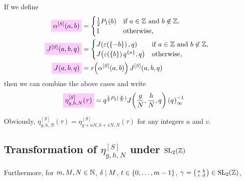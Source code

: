 \documentclass{article}
\begin{document}
If we define
\begin{align}
  \defineNotation[alpha-Schoeneberg-Contribution]{\alphaSchoenebergContribution{a}{b}}
  &=
    \begin{cases}
      \frac{1}{2} P_1(b) & \text{if $a\in\setZ$ and $b\not\in\setZ$},
      \\
      1 & \text{otherwise,}
    \end{cases}
  \label{eq:alpha-Schoeneberg-Contribution}
  \\
  \defineNotation[Jacobi-Schoeneberg]{J^{[S]}(a,b,q)}
  &=
    \begin{cases}
      \jacobiFunction{\unityPower{\left\{-b\right\}}}{q} & \text{if $a\in\setZ$ and
        $b\not\in\setZ$},
      \\
      \jacobiFunction{\unityPower{\left\{b\right\}}q^{\{a\}}}{q} & \text{otherwise,}
    \end{cases}
  \label{eq:Jacobi-Schoeneberg}
  \\
  \defineNotation[Jacobi-a-b-q]{\jacobiAlpha{a}{b}{q}}
  &=
    \unityPower{\alphaSchoenebergContribution{a}{b}} \jacobiSchoeneberg{a}{b}{q}
  \label{eq:Jacobi_a-b-q}
\end{align}
then we can combine the above cases and write
\begin{align}
  \defineNotation[eta-g-h-N-tau-Schoeneberg]{\eta_{g,h,N}^{[S]}(\tau)}
  &=
  q^{\frac{1}{2} P_2(\frac{g}{N})}
    \jacobiAlpha{\frac{g}{N}}{\frac{h}{N}}{q}
    \eulerFunction{}^{-1}
  \label{eq:eta_g-h-N^[S](tau)}
\end{align}






Obviously, $\eta_{g,h,N}^{[S]}(\tau) = \eta_{g+uN,h+vN,N}^{[S]}(\tau)$ for
any integers $u$ and $v$.




\subsection{Transformation of $\eta_{g,h,N}^{[S]}$ under $\SL2Z$}

Furthermore, for $m, M, N\in\mathbb{N}$, $\delta \mid M$,
$t \in \left\{0,\ldots,m-1\right\}$,
$\gamma=\left(\begin{smallmatrix}a&b\\c&d\end{smallmatrix}\right)\in\SL2Z$,
\end{document}
